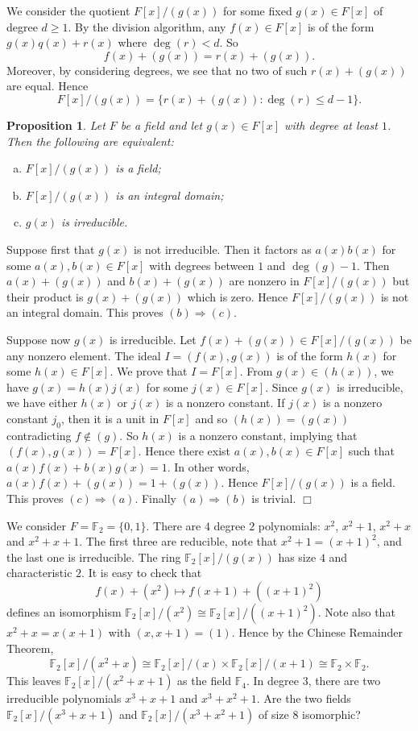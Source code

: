 \documentclass{article}
\def\F{{\mathbb F}}
\def\F{{\mathbb F}}
\newtheorem{proposition}[subsection]{Proposition}
\newenvironment{proof}{\noindent {\bf Proof:}}{$\Box$ \vspace{2 ex}}
\begin{document}
We consider the quotient $F[x]/(g(x))$ for some fixed $g(x)\in F[x]$ of degree $d\geq 1$. By the division algorithm, any $f(x)\in F[x]$ is of the form $g(x)q(x) + r(x)$ where $\deg(r) < d$. So $$f(x) + (g(x)) = r(x) + (g(x)).$$
Moreover, by considering degrees, we see that no two of such $r(x) + (g(x))$ are equal. Hence
$$F[x]/(g(x)) = \{r(x) + (g(x)) \colon  \deg(r) \leq d-1\}.$$

\begin{proposition}\label{prop:F/g}
    Let $F$ be a field and let $g(x)\in F[x]$ with degree at least $1$. Then the following are equivalent:
    \begin{enumerate}[(a)]
        \item $F[x]/(g(x))$ is a field;
        \item $F[x]/(g(x))$ is an integral domain;
        \item $g(x)$ is irreducible.
    \end{enumerate} 
\end{proposition}

\begin{proof}
    Suppose first that $g(x)$ is not irreducible. Then it factors as $a(x)b(x)$ for some $a(x),b(x)\in F[x]$ with degrees between $1$ and $\deg(g) - 1$. Then $a(x) + (g(x))$ and $b(x) + (g(x))$ are nonzero in $F[x]/(g(x))$ but their product is $g(x) + (g(x))$ which is zero. Hence $F[x]/(g(x))$ is not an integral domain. This proves $(b)\Rightarrow(c).$ 
    
    Suppose now $g(x)$ is irreducible. Let $f(x)+(g(x))\in F[x]/(g(x))$ be any nonzero element. The ideal $I = (f(x),g(x))$ is of the form $h(x)$ for some $h(x)\in F[x]$. We prove that $I = F[x]$. From $g(x)\in (h(x))$, we have $g(x) = h(x)j(x)$ for some $j(x)\in F[x]$. Since $g(x)$ is irreducible, we have either $h(x)$ or $j(x)$ is a nonzero constant. If $j(x)$ is a nonzero constant $j_0$, then it is a unit in $F[x]$ and so $(h(x)) = (g(x))$ contradicting $f\notin (g)$. So $h(x)$ is a nonzero constant, implying that $(f(x),g(x)) = F[x]$. Hence there exist $a(x),b(x)\in F[x]$ such that $a(x)f(x) + b(x)g(x) = 1$. In other words, $a(x)f(x) + (g(x)) = 1 + (g(x)).$ Hence $F[x]/(g(x))$ is a field. This proves $(c)\Rightarrow(a)$. Finally $(a)\Rightarrow(b)$ is trivial.
\end{proof}

We consider $F = \F_2 = \{0,1\}$. There are $4$ degree $2$ polynomials: $x^2$, $x^2 + 1$, $x^2 + x$ and $x^2 + x + 1$. The first three are reducible, note that $x^2 + 1 = (x + 1)^2$, and the last one is irreducible. The ring $\F_2[x]/(g(x))$ has size $4$ and characteristic $2$. It is easy to check that
$$f(x) + (x^2)\mapsto f(x+1) + ((x+1)^2)$$ defines an isomorphism $\F_2[x]/(x^2) \cong \F_2[x]/((x+1)^2).$ Note also that $x^2 + x = x(x+1)$ with $(x, x+1) = (1)$. Hence by the Chinese Remainder Theorem, $$\F_2[x]/(x^2 + x) \cong \F_2[x]/(x) \times \F_2[x]/(x+1) \cong \F_2\times\F_2.$$ This leaves $\F_2[x]/(x^2 + x + 1)$ as the field $\F_4$. In degree $3$, there are two irreducible polynomials $x^3 + x + 1$ and $x^3 + x^2 + 1$. Are the two fields $\F_2[x]/(x^3 + x + 1)$ and $\F_2[x]/(x^3 + x^2 + 1)$ of size 8 isomorphic?
\end{document}
